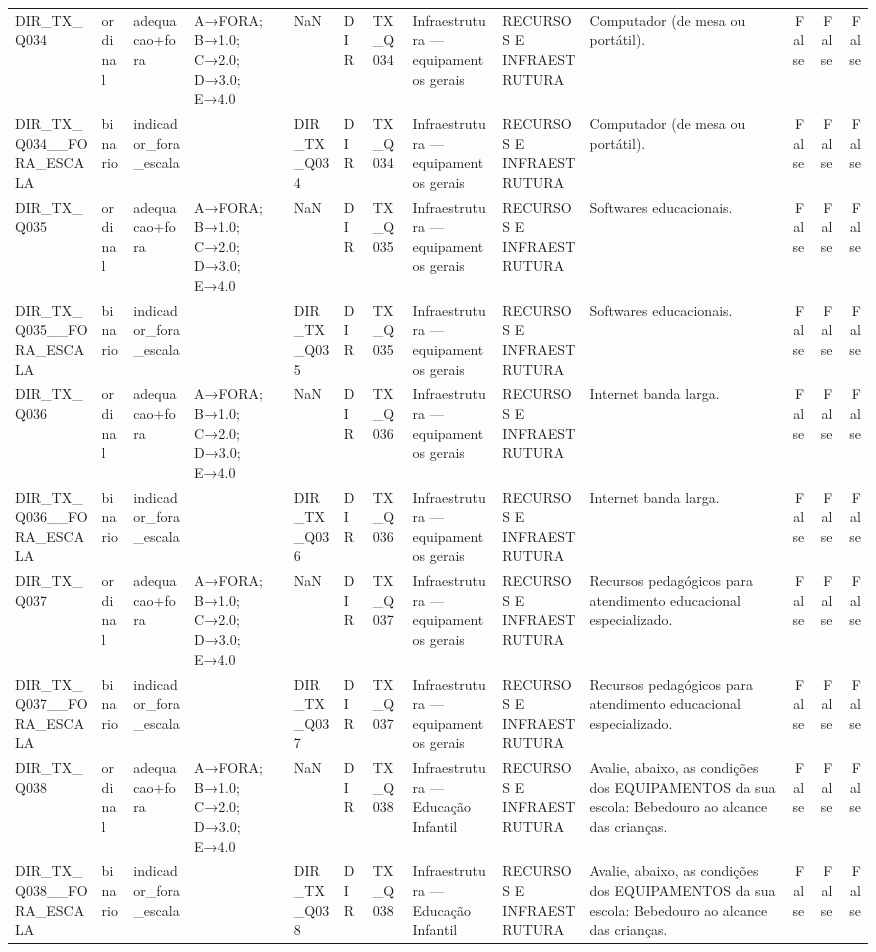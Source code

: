 \begin{tabular}{llllllllllrrr}
DIR\_TX\_Q034 & ordinal & adequacao+fora & A→FORA; B→1.0; C→2.0; D→3.0; E→4.0 & NaN & DIR & TX\_Q034 & Infraestrutura — equipamentos gerais & RECURSOS E INFRAESTRUTURA & Computador (de mesa ou portátil). & False & False & False \\
DIR\_TX\_Q034\_\_FORA\_ESCALA & binario & indicador\_fora\_escala &  & DIR\_TX\_Q034 & DIR & TX\_Q034 & Infraestrutura — equipamentos gerais & RECURSOS E INFRAESTRUTURA & Computador (de mesa ou portátil). & False & False & False \\
DIR\_TX\_Q035 & ordinal & adequacao+fora & A→FORA; B→1.0; C→2.0; D→3.0; E→4.0 & NaN & DIR & TX\_Q035 & Infraestrutura — equipamentos gerais & RECURSOS E INFRAESTRUTURA & Softwares educacionais. & False & False & False \\
DIR\_TX\_Q035\_\_FORA\_ESCALA & binario & indicador\_fora\_escala &  & DIR\_TX\_Q035 & DIR & TX\_Q035 & Infraestrutura — equipamentos gerais & RECURSOS E INFRAESTRUTURA & Softwares educacionais. & False & False & False \\
DIR\_TX\_Q036 & ordinal & adequacao+fora & A→FORA; B→1.0; C→2.0; D→3.0; E→4.0 & NaN & DIR & TX\_Q036 & Infraestrutura — equipamentos gerais & RECURSOS E INFRAESTRUTURA & Internet banda larga. & False & False & False \\
DIR\_TX\_Q036\_\_FORA\_ESCALA & binario & indicador\_fora\_escala &  & DIR\_TX\_Q036 & DIR & TX\_Q036 & Infraestrutura — equipamentos gerais & RECURSOS E INFRAESTRUTURA & Internet banda larga. & False & False & False \\
DIR\_TX\_Q037 & ordinal & adequacao+fora & A→FORA; B→1.0; C→2.0; D→3.0; E→4.0 & NaN & DIR & TX\_Q037 & Infraestrutura — equipamentos gerais & RECURSOS E INFRAESTRUTURA & Recursos pedagógicos para atendimento educacional especializado. & False & False & False \\
DIR\_TX\_Q037\_\_FORA\_ESCALA & binario & indicador\_fora\_escala &  & DIR\_TX\_Q037 & DIR & TX\_Q037 & Infraestrutura — equipamentos gerais & RECURSOS E INFRAESTRUTURA & Recursos pedagógicos para atendimento educacional especializado. & False & False & False \\
DIR\_TX\_Q038 & ordinal & adequacao+fora & A→FORA; B→1.0; C→2.0; D→3.0; E→4.0 & NaN & DIR & TX\_Q038 & Infraestrutura — Educação Infantil & RECURSOS E INFRAESTRUTURA & Avalie, abaixo, as condições dos EQUIPAMENTOS da sua escola: Bebedouro ao alcance das crianças. & False & False & False \\
DIR\_TX\_Q038\_\_FORA\_ESCALA & binario & indicador\_fora\_escala &  & DIR\_TX\_Q038 & DIR & TX\_Q038 & Infraestrutura — Educação Infantil & RECURSOS E INFRAESTRUTURA & Avalie, abaixo, as condições dos EQUIPAMENTOS da sua escola: Bebedouro ao alcance das crianças. & False & False & False \\

\end{tabular}
